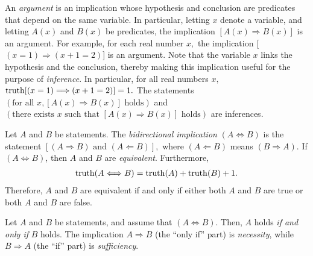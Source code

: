 An {\it argument} is an implication whose hypothesis and conclusion are predicates that depend on the same variable.
In particular, letting $x$ denote a variable, and letting $A(x)$ and $B(x)$ be predicates, the implication $[A(x)\Longrightarrow B(x)]$ is an argument.
%
%
For example, for each real number $x,$ the implication [$(x=1)\Longrightarrow (x+1=2)$] is an argument.
Note that the variable $x$ links the hypothesis and the conclusion, thereby making this implication useful for the purpose of {\it inference}.
%
In particular, for all real numbers $x,$ $\operatorname{truth}[(x=1)\Longrightarrow (x+1=2)]=1.$  The statements $(\mbox{for all }x, [A(x)\Longrightarrow B(x)]\mbox{ holds})$ and $(\mbox{there exists }x \mbox{ such that } [A(x)\Longrightarrow B(x)]\mbox{ holds})$ are inferences.





Let $A$ and $B$ be statements.
The {\it bidirectional implication} $(A\Longleftrightarrow B)$ is the statement
%
$[(A\Longrightarrow B) \mbox{ and } (A\Longleftarrow B)],$  where
$(A\Longleftarrow B)$ means $(B\Longrightarrow A)$.
%
If $(A\Longleftrightarrow B)$, then $A$ and $B$ are {\it equivalent}.
%
%
Furthermore,
%
\begin{align}
%
\truth(A\Longleftrightarrow B) = \truth(A) + \truth(B) + 1.
%
\end{align}
%
Therefore, $A$ and $B$ are equivalent if and only if either both $A$ and $B$
are true or both $A$ and $B$ are false.


%
%
%
%










Let $A$ and $B$ be statements, and assume that $(A\Longleftrightarrow B).$
%
Then, $A$ holds {\it if and only if} $B$ holds.  The
implication $A\Longrightarrow B$ (the ``only if'' part) is {\it necessity},
%
%
while $B\Longrightarrow A$ (the ``if'' part) is {\it sufficiency}.







